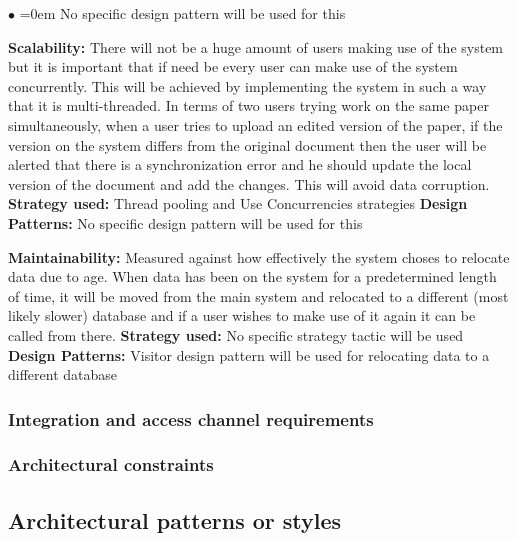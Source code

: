 \documentclass[english]{article}
\begin{document}
\begin{list}{$\bullet$}{\leftmargin=1.5cm \itemindent=0em}
					\newline No specific design pattern will be used for this				
					\item \textbf{Scalability:} There will not be a huge amount of users making use of the system but it is important that if need be every user can make use of the system concurrently. This will be achieved by implementing the system in such a way that it is multi-threaded. In terms of two users trying work on the same paper simultaneously, when a user tries to upload an edited version of the paper, if the version on the system differs from the original document then the user will be alerted that there is a synchronization error and he should update the local version of the document and add the changes. This will avoid data corruption.
					\newline \textbf{Strategy used:}
					\newline Thread pooling and Use Concurrencies strategies
					\newline \textbf{Design Patterns:}
					\newline No specific design pattern will be used for this
					\item \textbf{Maintainability:} Measured against how effectively the system choses to relocate data due to age. When data has been on the system for a predetermined length of time, it will be moved from the main system and relocated to a different (most likely slower) database and if a user wishes to make use of it again it can be called from there.
					\newline \textbf{Strategy used:}
					\newline No specific strategy tactic will be used
					\newline \textbf{Design Patterns:}
					\newline Visitor design pattern will be used for relocating data to a different database
				\end{list}
			
			\subsubsection{Integration and access channel requirements}
			
			\subsubsection{Architectural constraints}
			
		\subsection{Architectural patterns or styles}
		
\end{document}
